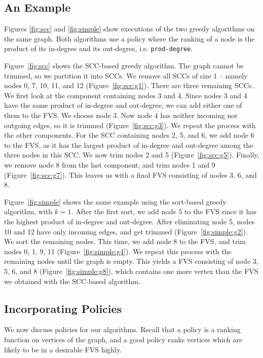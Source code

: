\subsection{An Example}\label{subsec:alg_example}

Figures \ref{fig:scc} and \ref{fig:simple} show executions of the two greedy algorithms on the same graph. Both algorithms use a policy where the ranking of a node is the product of its in-degree and its out-degree, i.e. \texttt{prod-degree}.

Figure~\ref{fig:scc} shows the SCC-based greedy algorithm. The graph cannot be trimmed, so we partition it into SCCs. We remove all SCCs of size 1 -- namely nodes 0, 7, 10, 11, and 12 (Figure~\ref{fig:scc:g1}). There are three remaining SCCs. We first look at the component containing nodes 3 and 4. Since nodes 3 and 4 have the same product of in-degree and out-degree, we can add either one of them to the FVS. We choose node 3. Now node 4 has neither incoming nor outgoing edges, so it is trimmed (Figure~\ref{fig:scc:g3}). We repeat the process with the other components. For the SCC containing nodes 2, 5, and 6, we add node 6 to the FVS, as it has the largest product of in-degree and out-degree among the three nodes in this SCC. We now trim nodes 2 and 5 (Figure~\ref{fig:scc:g5}). Finally, we remove node 8 from the last component, and trim nodes 1 and 9 (Figure~\ref{fig:scc:g7}). This leaves us with a final FVS consisting of nodes 3, 6, and 8.

Figure~\ref{fig:simple} shows the same example using the sort-based greedy algorithm, with $k = 1$. After the first sort, we add node 5 to the FVS since it has the highest product of in-degree and out-degree. After eliminating node 5, nodes 10 and 12 have only incoming edges, and get trimmed (Figure~\ref{fig:simple:g2}). We sort the remaining nodes. This time, we add node 8 to the FVS, and trim nodes 0, 1, 9, 11 (Figure~\ref{fig:simple:g4}). We repeat this process with the remaining nodes until the graph is empty. This yields a FVS consisting of node 3, 5, 6, and 8 (Figure~\ref{fig:simple:g8}), which contains one more vertex than the FVS we obtained with the SCC-based algorithm.


\subsection{Incorporating Policies}
\label{subsec:validator_reordering:policy}

We now discuss policies for our algorithms. Recall that a policy is a ranking function on vertices of the graph, and a good policy ranks vertices which are likely to be in a desirable FVS highly. 

